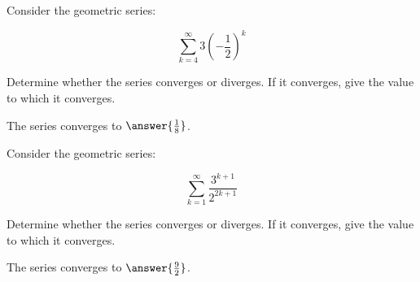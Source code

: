 \documentclass{ximera}
\author{Jim Talamo}
\begin{document}
\begin{exercise}
Consider the geometric series:

\[
\sum_{k=4}^{\infty} 3\left(-\frac{1}{2}\right)^k
\]

Determine whether the series converges or diverges.  If it converges, give the value to which it converges.

\begin{multipleChoice}
\end{multipleChoice}

\begin{exercise}
The series converges to $\answer{\frac{1}{8}}$.
\end{exercise}
\end{exercise}

\begin{exercise}
Consider the geometric series:

\[
\sum_{k=1}^{\infty} \frac{3^{k+1}}{2^{2k+1}}
\]

Determine whether the series converges or diverges.  If it converges, give the value to which it converges.

\begin{multipleChoice}
\end{multipleChoice}

\begin{exercise}
The series converges to $\answer{\frac{9}{2}}$.
\end{exercise}


\end{exercise}
\end{document}
